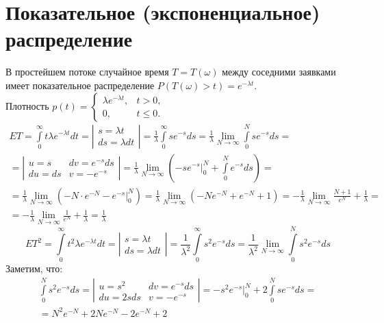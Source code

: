 \section{Показательное (экспоненциальное) распределение}
В простейшем потоке случайное время $T=T(\omega)$ между соседними заявками имеет показательное распределение $P(T(\omega) > t) = e^{-\lambda t}$.\\
Плотность $p(t)=\left\{\begin{matrix}
\lambda e^{-\lambda t}, & t > 0,\\
0, & t \leq 0.
\end{matrix}\right.$
\begin{multline*}
ET = \int\limits_0^\infty t\lambda e^{-\lambda t} dt = \left| \begin{matrix}
s = \lambda t \\
ds = \lambda dt
\end{matrix} \right| = \frac{1}{\lambda}\int\limits_0^\infty s e^{-s}ds = \frac{1}{\lambda}\lim\limits_{N\rightarrow\infty}\int\limits_0^N s e^{-s}ds=\\
=\left|\begin{matrix}
u=s & dv = e^{-s} ds\\
du = ds & v = -e^{-s}
\end{matrix}\right| = \frac{1}{\lambda} \lim\limits_{N\rightarrow\infty}\left(-s e^{-s}\bigg|_0^N +\int\limits_0^N e^{-s} ds\right)=\\
=\frac{1}{\lambda}\lim\limits_{N\rightarrow\infty}\left(-N\cdot e^{-N}-e^{-s}\bigg|_0^N\right)=\frac{1}{\lambda}\lim\limits_{N\rightarrow\infty}(-N e^{-N}+e^{-N}+1) = -\frac{1}{\lambda}\lim\limits_{N\rightarrow\infty}\frac{N+1}{e^N}+\frac{1}{\lambda}=\\
=-\frac{1}{\lambda}\lim\limits_{N\rightarrow\infty}\frac{1}{e^N}+\frac{1}{\lambda}=\frac{1}{\lambda}
\end{multline*}
$$ET^2=\int\limits_0^\infty t^2 \lambda e^{-\lambda t} dt = \left|\begin{matrix}s=\lambda t\\ ds = \lambda dt\end{matrix}\right|=\frac{1}{\lambda^2}\int\limits_0^\infty s^2 e^{-s}ds=\frac{1}{\lambda^2}\lim\limits_{N\rightarrow\infty}\int\limits_0^N s^2 e^{-s}ds$$
Заметим, что:
\begin{multline*}
\int\limits_0^N s^2 e^{-s} ds = \left|\begin{matrix}u=s^2 & dv = e^{-s}ds\\
du = 2sds & v = -e^{-s}\end{matrix}\right|=-s^2 e^{-s}\bigg|_0^N+2\int\limits_0^N s e^{-s}ds=\\=N^2 e^{-N}+2Ne^{-N}-2e^{-N}+2
\end{multline*}
